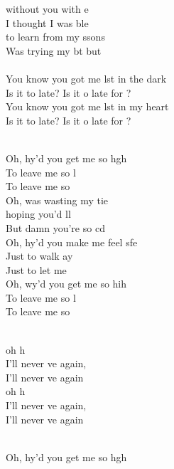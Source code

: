 \begin{cancion}
	without you with e\\
	I thought I was ble \\
	to learn from my ssons\\
	Was trying my bt but\\
\jump\\
	You know you got me lst in the dark\\
	Is it to late? Is it o late for ?\\
	You know you got me lst in my heart\\
	Is it to late? Is it o late for ?\\\jump\\
	\begin{chorus}%
	Oh, hy'd you get me so hgh\\
	To leave me so l\\
	To leave me so\\
	Oh,  was wasting my tie \\
	hoping you'd ll\\
	But damn you're so cd\\
	Oh, hy'd you make me feel sfe\\
	Just to walk ay\\
	Just to let me \\
	Oh, wy'd you get me so hih\\
	To leave me so l\\
	To leave me so\\
	\end{chorus}%
	\jump\\
	oh h\\
	I'll never ve again, \\
	I'll never ve again\\
	oh h\\
	I'll never ve again, \\
	I'll never ve again\\\jump\\
	\begin{chorus}%
	Oh, hy'd you get me so hgh\\

\end{chorus}
\end{cancion}
